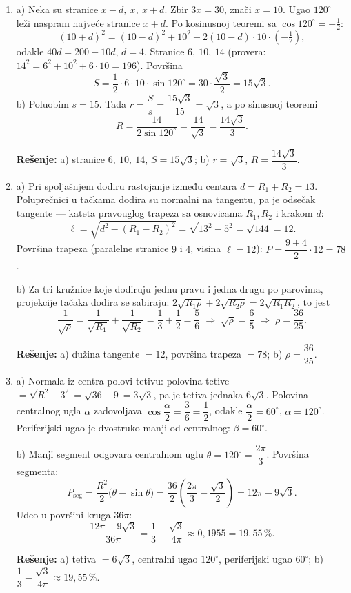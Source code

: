 \begin{enumerate}[label=\arabic*.]
\textbf{Rešenje:} a) $d_1=24,\ d_2=10$, $P=120$, $r=\dfrac{60}{13}$; \; b) $d_1=12,\ d_2=16$, $a=10$, $r=\dfrac{24}{5}$.

\item a) Neka su stranice $x-d,\ x,\ x+d$. Zbir $3x=30$, znači $x=10$. Ugao $120^\circ$ leži naspram najveće stranice $x+d$. Po kosinusnoj teoremi sa $\cos 120^\circ=-\tfrac12$:
\[ (10+d)^2=(10-d)^2+10^2-2(10-d)\cdot 10\cdot\left(-\tfrac12\right), \]
odakle $40d=200-10d$, $d=4$. Stranice $6,\ 10,\ 14$ (provera: $14^2=6^2+10^2+6\cdot 10=196$). Površina
\[ S=\frac12\cdot 6\cdot 10\cdot\sin 120^\circ=30\cdot\frac{\sqrt3}{2}=15\sqrt3. \]
b) Poluobim $s=15$. Tada $r=\dfrac{S}{s}=\dfrac{15\sqrt3}{15}=\sqrt3$, a po sinusnoj teoremi
\[ R=\frac{14}{2\sin 120^\circ}=\frac{14}{\sqrt3}=\frac{14\sqrt3}{3}. \]

\textbf{Rešenje:} a) stranice $6,\ 10,\ 14$, $S=15\sqrt3$; \; b) $r=\sqrt3$, $R=\dfrac{14\sqrt3}{3}$.

\item a) Pri spoljašnjem dodiru rastojanje između centara $d=R_1+R_2=13$. Poluprečnici u tačkama dodira su normalni na tangentu, pa je odsečak tangente — kateta pravouglog trapeza sa osnovicama $R_1,R_2$ i krakom $d$:
\[ \ell=\sqrt{d^2-(R_1-R_2)^2}=\sqrt{13^2-5^2}=\sqrt{144}=12. \]
Površina trapeza (paralelne stranice $9$ i $4$, visina $\ell=12$): $P=\dfrac{9+4}{2}\cdot 12=78$.

b) Za tri kružnice koje dodiruju jednu pravu i jedna drugu po parovima, projekcije tačaka dodira se sabiraju: $2\sqrt{R_1\rho}+2\sqrt{R_2\rho}=2\sqrt{R_1R_2}$, to jest
\[ \frac{1}{\sqrt{\rho}}=\frac{1}{\sqrt{R_1}}+\frac{1}{\sqrt{R_2}}=\frac13+\frac12=\frac56\;\Rightarrow\;\sqrt{\rho}=\frac65\;\Rightarrow\;\rho=\frac{36}{25}. \]

\textbf{Rešenje:} a) dužina tangente $=12$, površina trapeza $=78$; \; b) $\rho=\dfrac{36}{25}$.

\item a) Normala iz centra polovi tetivu: polovina tetive $=\sqrt{R^2-3^2}=\sqrt{36-9}=3\sqrt3$, pa je tetiva jednaka $6\sqrt3$. Polovina centralnog ugla $\alpha$ zadovoljava $\cos\dfrac{\alpha}{2}=\dfrac{3}{6}=\dfrac12$, odakle $\dfrac{\alpha}{2}=60^\circ$, $\alpha=120^\circ$. Periferijski ugao je dvostruko manji od centralnog: $\beta=60^\circ$.

b) Manji segment odgovara centralnom uglu $\theta=120^\circ=\dfrac{2\pi}{3}$. Površina segmenta:
\[ P_{\text{seg}}=\frac{R^2}{2}\bigl(\theta-\sin\theta\bigr)=\frac{36}{2}\left(\frac{2\pi}{3}-\frac{\sqrt3}{2}\right)=12\pi-9\sqrt3. \]
Udeo u površini kruga $36\pi$:
\[ \frac{12\pi-9\sqrt3}{36\pi}=\frac13-\frac{\sqrt3}{4\pi}\approx 0{,}1955=19{,}55\,\%. \]

\textbf{Rešenje:} a) tetiva $=6\sqrt3$, centralni ugao $120^\circ$, periferijski ugao $60^\circ$; \; b) $\dfrac{1}{3}-\dfrac{\sqrt3}{4\pi}\approx 19{,}55\,\%$.

\end{enumerate}
\clearpage
